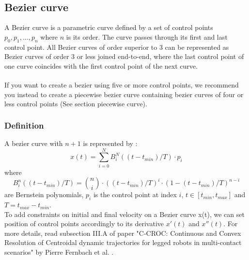 \documentclass{article}
\begin{document}
\subsection{Bezier curve}

    A Bezier curve is a parametric curve defined by a set of control points ${p_0, p_1, ..., p_n}$ where $n$ is its order. The curve passes through its first and last control point.
    All Bezier curves of order superior to 3 can be represented as Bezier curves of order 3 or less joined end-to-end, where the last control point of one curve coincides with the first control point of the next curve. \\\\
    
    If you want to create a bezier using five or more control points, we recommend you instead to create a piecewise bezier curve containing bezier curves of four or less control points 
    (See section piecewise curve).
    
    \subsubsection{Definition}
    A bezier curve with $n+1$ is represented by :
    \begin{equation}\label{eq:bezierBernstein}
    x(t) = \sum_{i=0}^{N} B_i^N((t-t_{min})/T) \cdot p_i
    \end{equation}
    where 
    \begin{equation}\label{eq:bernstein}
    B_i^n((t-t_{min})/T) = \binom{n}{i} \cdot ((t-t_{min})/T)^i \cdot (1-(t-t_{min})/T)^{n-i}
    \end{equation}
    are Bernstein polynomials, $p_i$ is the control point at index $i$, $t \in [t_{min},t_{max}]$ and $T=t_{max}-t_{min}$.\\
    
    To add constraints on initial and final velocity on a Bezier curve x(t), we can set position of control points accordingly to its derivative $x'(t)$ and $x''(t)$. For more details, read subsection III.A of paper "C-CROC: Continuous and Convex Resolution of Centroidal dynamic trajectories for legged robots in multi-contact scenarios" by Pierre Fernbach et al. .
    
\end{document}
